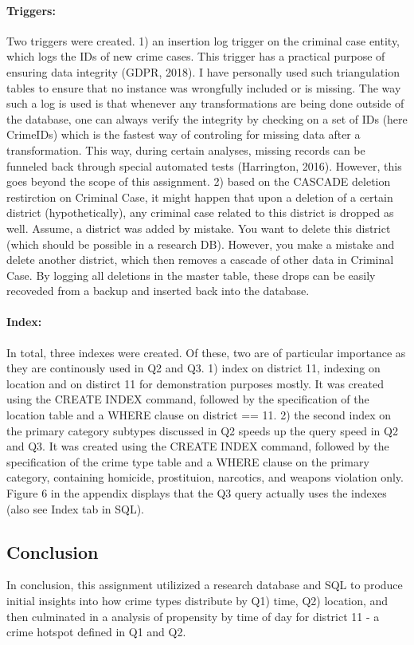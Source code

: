 \documentclass[a4paper]{article}
\begin{document}
\paragraph{Triggers:} Two triggers were created. 1) an insertion log trigger on the criminal case entity, which logs the IDs of new crime cases. This trigger has a practical purpose of ensuring data integrity (GDPR, 2018). I have personally used such triangulation tables to ensure that no instance was wrongfully included or is missing. The way such a log is used is that whenever any transformations are being done outside of the database, one can always verify the integrity by checking on a set of IDs (here CrimeIDs) which is the fastest way of controling for missing data after a transformation. This way, during certain analyses, missing records can be funneled back through special automated tests (Harrington, 2016). However, this goes beyond the scope of this assignment.
2) based on the CASCADE deletion restirction on Criminal Case, it might happen that upon a deletion of a certain district (hypothetically), any criminal case related to this district is dropped as well. Assume, a district was added by mistake. You want to delete this district (which should be possible in a research DB). However, you make a mistake and delete another district, which then removes a cascade of other data in Criminal Case. By logging all deletions in the master table, these drops can be easily recoveded from a backup and inserted back into the database.
\paragraph{Index:} In total, three indexes were created. Of these, two are of particular importance as they are continously used in Q2 and Q3. 1) index on district 11, indexing on location and on distirct 11 for demonstration purposes mostly. It was created using the CREATE INDEX command, followed by the specification of the location table and a WHERE clause on district == 11. 2) the second index on the primary category subtypes discussed in Q2 speeds up the query speed in Q2 and Q3. It was created using the CREATE INDEX command, followed by the specification of the crime type table and a WHERE clause on the primary category, containing homicide, prostituion, narcotics, and weapons violation only. Figure 6 in the appendix displays that the Q3 query actually uses the indexes (also see Index tab in SQL).  


\subsection{Conclusion}
In conclusion, this assignment utilizized a research database and SQL to produce initial insights into how crime types distribute by Q1) time, Q2) location, and then culminated in a analysis of propensity by time of day for district 11 - a crime hotspot defined in Q1 and Q2.
\end{document}
